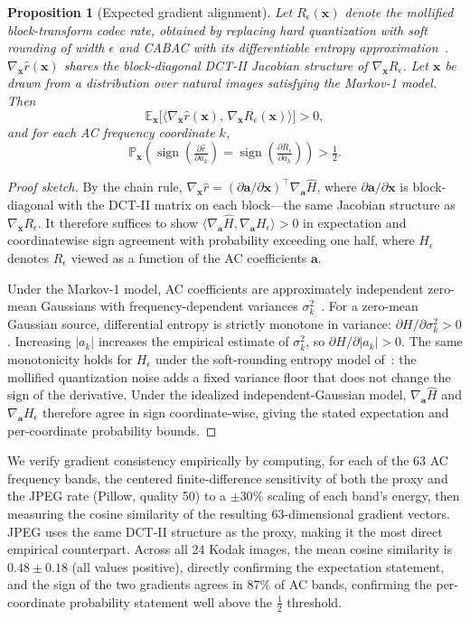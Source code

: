 \documentclass{article}
\newtheorem{proposition}{Proposition}
\theoremstyle{definition}
\newcommand{\bx}{\boldsymbol{x}}
\newcommand{\ba}{\boldsymbol{a}}
\begin{document}
\begin{proposition}[Expected gradient alignment]
\label{prop:grad}
Let $R_\epsilon(\bx)$ denote the mollified block-transform codec rate, obtained by replacing hard quantization with soft rounding of width $\epsilon$ and CABAC with its differentiable entropy approximation~\citep{balle2018variational}.
$\nabla_{\bx} \hat{r}(\bx)$ shares the block-diagonal DCT-II Jacobian structure of $\nabla_{\bx} R_\epsilon$.
Let $\bx$ be drawn from a distribution over natural images satisfying the Markov-1 model.
Then
\[
  \mathbb{E}_{\bx}\big[\langle \nabla_{\bx}\hat r(\bx),\, \nabla_{\bx} R_\epsilon(\bx)\rangle\big] > 0,
\]
and for each AC frequency coordinate $k$,
\[
  \mathbb{P}_{\bx}\!\left(\operatorname{sign}\!\left(\tfrac{\partial \hat r}{\partial a_k}\right) = \operatorname{sign}\!\left(\tfrac{\partial R_\epsilon}{\partial a_k}\right)\right) > \tfrac12.
\]
\end{proposition}

\begin{proof}[Proof sketch]
By the chain rule, $\nabla_{\bx}\hat{r} = (\partial\ba/\partial\bx)^\top\nabla_{\ba}\hat{H}$, where $\partial\ba/\partial\bx$ is block-diagonal with the DCT-II matrix on each block---the same Jacobian structure as $\nabla_{\bx} R_\epsilon$.
It therefore suffices to show $\langle\nabla_{\ba}\hat{H},\nabla_{\ba} H_\epsilon\rangle > 0$ in expectation and coordinatewise sign agreement with probability exceeding one half, where $H_\epsilon$ denotes $R_\epsilon$ viewed as a function of the AC coefficients $\ba$.

Under the Markov-1 model, AC coefficients are approximately independent zero-mean Gaussians with frequency-dependent variances $\sigma_k^2$~\citep{clarke1985transform}.
For a zero-mean Gaussian source, differential entropy is strictly monotone in variance: $\partial H / \partial \sigma_k^2 > 0$.
Increasing $|a_k|$ increases the empirical estimate of $\sigma_k^2$, so $\partial H / \partial |a_k| > 0$.
The same monotonicity holds for $H_\epsilon$ under the soft-rounding entropy model of~\citet{balle2018variational}: the mollified quantization noise adds a fixed variance floor that does not change the sign of the derivative.
Under the idealized independent-Gaussian model, $\nabla_{\ba}\hat{H}$ and $\nabla_{\ba} H_\epsilon$ therefore agree in sign coordinate-wise, giving the stated expectation and per-coordinate probability bounds.
\end{proof}

We verify gradient consistency empirically by computing, for each of the 63 AC frequency bands, the centered finite-difference sensitivity of both the proxy and the JPEG rate (Pillow, quality 50) to a $\pm30\%$ scaling of each band's energy, then measuring the cosine similarity of the resulting 63-dimensional gradient vectors.
JPEG uses the same DCT-II structure as the proxy, making it the most direct empirical counterpart.
Across all 24 Kodak images, the mean cosine similarity is $0.48 \pm 0.18$ (all values positive), directly confirming the expectation statement, and the sign of the two gradients agrees in 87\% of AC bands, confirming the per-coordinate probability statement well above the $\tfrac12$ threshold.
\end{document}
